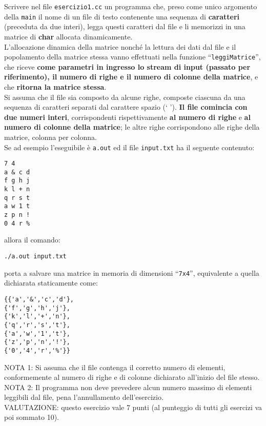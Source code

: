 
%

Scrivere nel file {\tt esercizio1.cc} un programma che, 
preso come unico argomento della \texttt{main} il nome di un file di testo
contenente una sequenza di \textbf{caratteri} (preceduta da due interi), legga questi caratteri dal file
e li memorizzi in una matrice di \textbf{char} allocata dinamicamente.\\

L'allocazione dinamica della matrice nonch\'e la lettura dei dati dal file
e il popolamento della matrice stessa vanno effettuati nella funzione
``\texttt{leggiMatrice}'', che riceve \textbf{come parametri in ingresso
lo stream di input (passato per riferimento), il numero di righe
e il numero di colonne della matrice}, e che \textbf{ritorna la matrice stessa}.\\

Si assuma che il file sia composto da alcune righe, composte ciascuna
da una sequenza di caratteri separati dal carattere spazio (` ').
\textbf{Il file comincia con due numeri interi}, corrispondenti rispettivamente
\textbf{al numero di righe} e \textbf{al numero di colonne della matrice};
le altre righe corrispondono alle righe della matrice, colonna per colonna.\\

\noindent
Se ad esempio l'eseguibile \`e \texttt{a.out} ed il file 
\texttt{input.txt} ha il seguente contenuto:
\begin{verbatim}
7 4
a & c d
f g h j
k l + n
q r s t
a w 1 t
z p n !
0 4 r %
\end{verbatim}
allora il comando:

\begin{verbatim}
./a.out input.txt
\end{verbatim}
\noindent
porta a salvare una matrice in memoria di dimensioni ``{\tt 7x4}'',
equivalente a quella dichiarata staticamente come:
\begin{verbatim}
{{'a','&','c','d'},
{'f','g','h','j'},
{'k','l','+','n'},
{'q','r','s','t'},
{'a','w','1','t'},
{'z','p','n','!'},
{'0','4','r','%'}}
\end{verbatim}

\vspace{.3cm}

NOTA 1:
Si assuma che il file contenga il corretto numero di elementi,
conformemente al numero di righe e di colonne dichiarato
all'inizio del file stesso.\\

NOTA 2:
Il programma non deve prevedere alcun numero massimo di elementi 
leggibili dal file, pena l'annullamento dell'esercizio.\\

VALUTAZIONE:
questo esercizio vale 7 punti (al punteggio di tutti gli esercizi va poi sommato 10).

%

